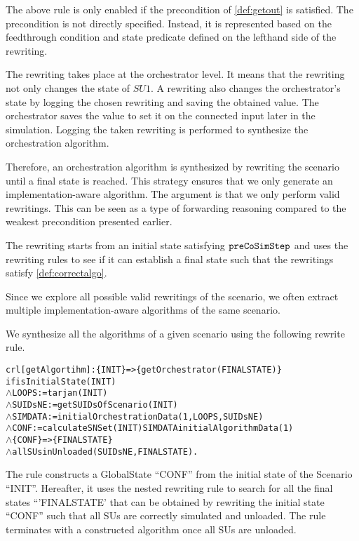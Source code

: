 The above rule is only enabled if the precondition of \cref{def:getout} is satisfied.
The precondition is not directly specified. 
Instead, it is represented based on the feedthrough condition and state predicate defined on the lefthand side of the rewriting.

The rewriting takes place at the orchestrator level.
It means that the rewriting not only changes the state of $SU1$.
A rewriting also changes the orchestrator's state by logging the chosen rewriting and saving the obtained value.
The orchestrator saves the value to set it on the connected input later in the simulation.
Logging the taken rewriting is performed to synthesize the orchestration algorithm. 

Therefore, an orchestration algorithm is synthesized by rewriting the scenario until a final state is reached. 
This strategy ensures that we only generate an implementation-aware algorithm. 
The argument is that we only perform valid rewritings.
This can be seen as a type of forwarding reasoning compared to the weakest precondition presented earlier.

The rewriting starts from an initial state satisfying $\mathtt{preCoSimStep}$ and uses the rewriting rules to see if it can establish a final state such that the rewritings satisfy \cref{def:correctalgo}.

Since we explore all possible valid rewritings of the scenario, we often extract multiple implementation-aware algorithms of the same scenario.

We synthesize all the algorithms of a given scenario using the following rewrite rule.
\begin{alltt}
  \small
crl [getAlgortihm]: \{ INIT \} => \{ getOrchestrator(FINALSTATE) \}
if isInitialState(INIT)
  \(\land\) LOOPS := tarjan(INIT)
  \(\land\) SUIDsNE := getSUIDsOfScenario(INIT)
  \(\land\) SIMDATA := initialOrchestrationData(1,LOOPS,SUIDsNE)
  \(\land\) CONF := calculateSNSet(INIT) SIMDATA initialAlgorithmData(1)
  \(\land\) \{CONF\} => \{ FINALSTATE\} 
  \(\land\) allSUsinUnloaded(SUIDsNE, FINALSTATE) .
\end{alltt}

The rule constructs a GlobalState ``CONF'' from the initial state of the Scenario ``INIT''.
Hereafter, it uses the nested  rewriting rule to search for all the final states ``'FINALSTATE' that can be obtained by rewriting the initial state ``CONF'' such that all SUs are correctly simulated and unloaded.
The rule terminates with a constructed algorithm once all SUs are unloaded.

